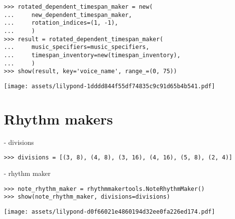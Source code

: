 \begin{singlespacing}
\vspace{-0.5\baselineskip}
\begin{lstlisting}
>>> rotated_dependent_timespan_maker = new(
...     new_dependent_timespan_maker,
...     rotation_indices=(1, -1),
...     )
>>> result = rotated_dependent_timespan_maker(
...     music_specifiers=music_specifiers,
...     timespan_inventory=new(timespan_inventory),
...     )
>>> show(result, key='voice_name', range_=(0, 75))
\end{lstlisting}
\noindent\texttt{[image: assets/lilypond-1dddd844f55df74835c9c91d65b4b541.pdf]}
\end{singlespacing}

\section{Rhythm makers}

- divisions

\begin{comment}
<abjad>
divisions = [(3, 8), (4, 8), (3, 16), (4, 16), (5, 8), (2, 4)]
</abjad>
\end{comment}

\begin{singlespacing}
\vspace{-0.5\baselineskip}
\begin{lstlisting}
>>> divisions = [(3, 8), (4, 8), (3, 16), (4, 16), (5, 8), (2, 4)]
\end{lstlisting}
\end{singlespacing}

- rhythm maker

\begin{comment}
<abjad>
note_rhythm_maker = rhythmmakertools.NoteRhythmMaker()
show(note_rhythm_maker, divisions=divisions)
</abjad>
\end{comment}

\begin{singlespacing}
\vspace{-0.5\baselineskip}
\begin{lstlisting}
>>> note_rhythm_maker = rhythmmakertools.NoteRhythmMaker()
>>> show(note_rhythm_maker, divisions=divisions)
\end{lstlisting}
\noindent\texttt{[image: assets/lilypond-d0f66021e4860194d32ee0fa226ed174.pdf]}
\end{singlespacing}

